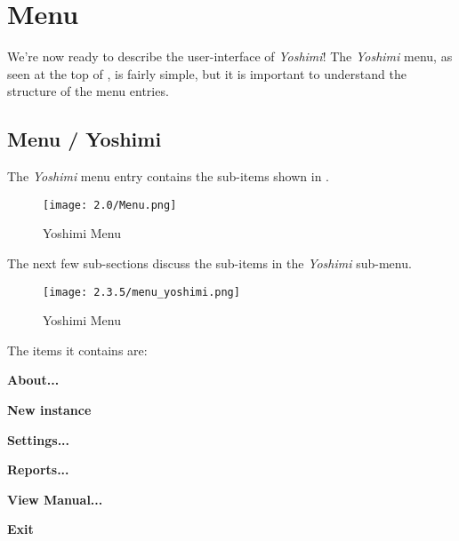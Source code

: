 %
%
%

\section{Menu}
\label{sec:menu}

   We're now ready to describe the user-interface of \textsl{Yoshimi}!
   The \textsl{Yoshimi} menu, as seen at the top of
   ,
   is fairly simple, but it is important to understand the
   structure of the menu entries.

\subsection{Menu / Yoshimi}
\label{subsec:menu_yoshimi}

   The \textsl{Yoshimi}
   menu entry contains the sub-items shown in
   .
   \begin{figure}[H]
   \centering
   \texttt{[image: 2.0/Menu.png]}
   \caption[Yoshimi Menu, Exit]{Yoshimi Menu}
   \label{fig:yoshimi_menu_items}
\end{figure}
   The next few sub-sections discuss the sub-items in the
   \textsl{Yoshimi} sub-menu.

\begin{figure}[H]
   \centering
   \texttt{[image: 2.3.5/menu\_yoshimi.png]}
   \caption[Yoshimi Menu, Exit]{Yoshimi Menu}
   \label{fig:yoshimi_view_yoshimi}
\end{figure}

   The items it contains are:

   \begin{enumber}
      \item \textbf{About...}
      \item \textbf{New instance}
      \item \textbf{Settings...}
      \item \textbf{Reports...}
      \item \textbf{View Manual...}
      \item \textbf{Exit}
   \end{enumber}

